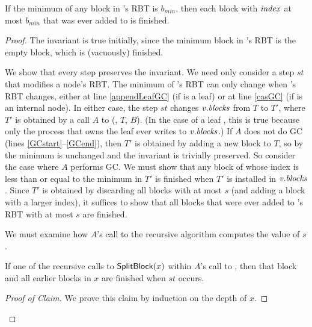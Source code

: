 \begin{invariant}\label{lem::finished}
If the minimum  of any block in 's RBT is $b_{min}$, then
each block with $\mbox{\textit{index}}$ at most $b_{min}$ that was ever added to  is finished.
\end{invariant}
\begin{proof}
The invariant is true initially, since the minimum  block in 's RBT is the empty block, which is (vacuously) finished.

We show that every step preserves the invariant.  
We need only consider a step $st$ that modifies a node's RBT.
The minimum  of 's RBT can only change when 's RBT changes, either at line 
\ref{appendLeafGC} (if  is a leaf) or at line \ref{casGC} (if  is an internal node).
In either case, the step $st$ changes $\mbox{\textnormal{\textit{v}}}.\mbox{\textit{blocks}}$ 
from $T$ to $T'$, where $T'$ is obtained by  a call $A$ to (, $T$, $B$).
(In the case of a leaf , this is true because only the process that owns the leaf ever
writes to $\mbox{\textnormal{\textit{v}}}.\mbox{\textit{blocks}}$.)
If $A$ does not do GC (lines \ref{GCstart}--\ref{GCend}), 
then $T'$ is obtained by adding a new block to $T$, so by  the minimum 
is unchanged and the invariant is trivially preserved.
So consider the case where $A$ performs GC.
We must show that any block of  whose index is less than or equal to the
minimum  in $T'$ is finished when $T'$ is installed in $\mbox{\textnormal{\textit{v}}}.\mbox{\textit{blocks}}$.
Since $T'$ is obtained by discarding all blocks with  at most $s$ (and adding
a block with a larger index), it suffices to show that all blocks that were ever added
to 's RBT with  at most $s$ are finished.

We must examine how $A$'s call to the recursive algorithm  computes the value of $s$.

\begin{claim}\label{splitfinished}
If one of the recursive calls to ${\sf SplitBlock}(x)$ within $A$'s call to ,
then that block and all earlier blocks in $x$ are finished when $st$ occurs.
\end{claim}
\begin{proof}[Proof of Claim]
We prove this claim  by induction on the depth of $x$.


\end{proof}
\end{proof}
